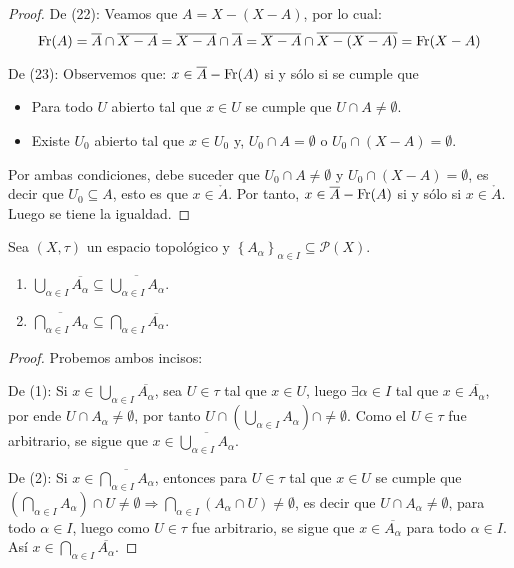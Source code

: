 \documentclass[12pt]{report}
\theoremstyle{largebreak}
\newcommand{\Int}[1]{\ensuremath{\mathring{#1}}}
\newcommand{\Cls}[1]{\ensuremath{\overline{#1}}}
\newcommand{\Fr}[1]{\ensuremath{\textup{Fr}(#1)}}
\begin{document}
\begin{proof}
        De (22): Veamos que $A=X-(X-A)$, por lo cual:
        \begin{equation*}
            \Fr{A}=\Cls{A}\cap\Cls{X-A}=\Cls{X-A}\cap\Cls{A}=\Cls{X-A}\cap\Cls{X-(X-A)}=\Fr{X-A}
        \end{equation*}

        De (23): Observemos que: $x\in\Cls{A}-\Fr{A}$ si y sólo si se cumple que
        \begin{itemize}
            \item Para todo $U$ abierto tal que $x\in U$ se cumple que $U\cap A\neq\emptyset$.
            \item Existe $U_0$ abierto tal que $x\in U_0$ y, $U_0\cap A=\emptyset$ o $U_0\cap (X-A)=\emptyset$.
        \end{itemize}
        Por ambas condiciones, debe suceder que $U_0\cap A\neq\emptyset$ y $U_0\cap(X-A)=\emptyset$, es decir que $U_0 \subseteq A$, esto es que $x\in\Int{A}$. Por tanto, $x\in \Cls{A}-\Fr{A}$ si y sólo si $x\in\Int{A}$. Luego se tiene la igualdad.
    \end{proof}

    \renewcommand{\theenumi}{\arabic{enumi}}

    \begin{propo}
        Sea $(X,\tau)$ un espacio topológico y $\left\{A_\alpha \right\}_{\alpha\in I}\subseteq\mathcal{P}(X)$.
        \begin{enumerate}
            \item $\bigcup_{\alpha\in I}\Cls{A_\alpha}\subseteq\Cls{\bigcup_{\alpha\in I}A_\alpha}$.
            \item $\Cls{\bigcap_{\alpha\in I}A_\alpha}\subseteq\bigcap_{\alpha\in I}\Cls{A_\alpha}$. 
        \end{enumerate}
    \end{propo}
    
    \begin{proof}
        Probemos ambos incisos:
        
        De (1): Si $x\in \bigcup_{\alpha\in I}\Cls{A_\alpha}$, sea $U\in\tau$ tal que $x\in U$, luego $\exists \alpha\in I$ tal que $x\in \Cls{A_\alpha}$, por ende $U\cap A_\alpha\neq\emptyset$, por tanto $U\cap\left(\bigcup_{\alpha\in I}A_\alpha\right)\cap \neq\emptyset$. Como el $U\in\tau$ fue arbitrario, se sigue que $x\in\Cls{\bigcup_{\alpha\in I}A_\alpha}$.

        De (2): Si $x\in \Cls{\bigcap_{\alpha\in I}A_\alpha}$, entonces para $U\in\tau$ tal que $x\in U$ se cumple que $\left(\bigcap_{\alpha\in I}A_\alpha\right)\cap U\neq\emptyset\Rightarrow\bigcap_{\alpha\in I}\left(A_\alpha\cap U \right)\neq\emptyset$, es decir que $U\cap A_\alpha\neq\emptyset$, para todo $\alpha\in I$, luego como $U\in\tau$ fue arbitrario, se sigue que $x\in \Cls{A_\alpha}$ para todo $\alpha\in I$. Así $x\in\bigcap_{\alpha\in I}\Cls{A_\alpha}$. 
    \end{proof}
\end{document}

